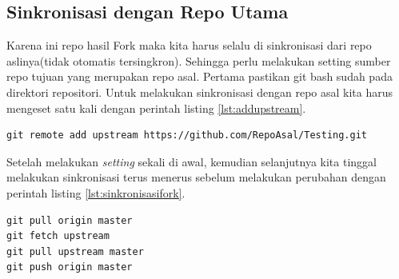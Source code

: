 \subsection{Sinkronisasi dengan Repo Utama}
Karena ini repo hasil Fork maka kita harus selalu di sinkronisasi dari repo aslinya(tidak otomatis tersingkron). Sehingga perlu melakukan setting sumber repo tujuan yang merupakan repo asal. Pertama pastikan git bash sudah pada direktori repositori. Untuk melakukan sinkronisasi dengan repo asal kita harus mengeset satu kali dengan perintah listing \ref{lst:addupstream}.

\begin{lstlisting}[caption=Set Repo Asal Sebagai Upstream,label={lst:addupstream}]
git remote add upstream https://github.com/RepoAsal/Testing.git
\end{lstlisting}

Setelah melakukan \textit{setting} sekali di awal, kemudian selanjutnya kita tinggal melakukan sinkronisasi terus menerus sebelum melakukan perubahan dengan perintah listing \ref{lst:sinkronisasifork}.

\begin{lstlisting}[caption=Perintah Sinkronisasi dengan repo asal,label={lst:sinkronisasifork}]
git pull origin master
git fetch upstream
git pull upstream master
git push origin master
\end{lstlisting}


